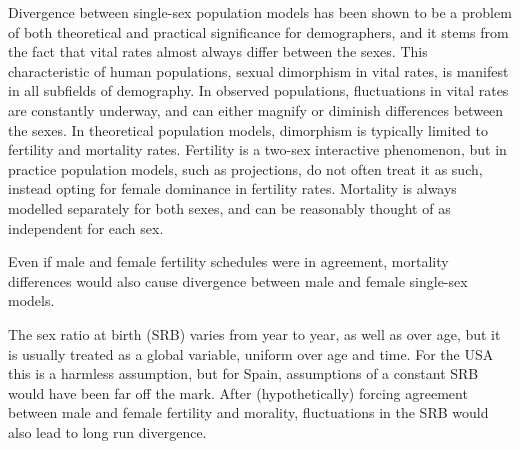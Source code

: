  \FloatBarrier
Divergence between single-sex population models has been shown to be a problem
of both theoretical and practical significance for demographers, and it stems from
the fact that vital rates almost always differ between the sexes.
This characteristic of human populations, sexual dimorphism in vital rates,
is manifest in all subfields of demography. In observed populations,
fluctuations in vital rates are constantly underway, and can either magnify or
diminish differences between the sexes. In theoretical population models,
dimorphism is typically limited to fertility and mortality rates. Fertility 
is a two-sex interactive phenomenon, but in practice 
population models, such as projections, do not often treat it as
such, instead opting for female dominance in fertility rates. Mortality is
always modelled separately for both sexes, and can be reasonably thought of 
as independent for each sex. 

Even if male and female
fertility schedules were in agreement, mortality differences would also
cause divergence between male and female single-sex models. 

The sex ratio at
birth (SRB) varies from year to year, as well as over age, but it is usually
treated as a global variable, uniform over age and time. For the USA this is 
a harmless assumption, but for Spain, 
assumptions of a constant SRB would have been far off the mark. After
(hypothetically) forcing agreement between male and female fertility and
morality, fluctuations in the SRB would also lead to long run divergence.



